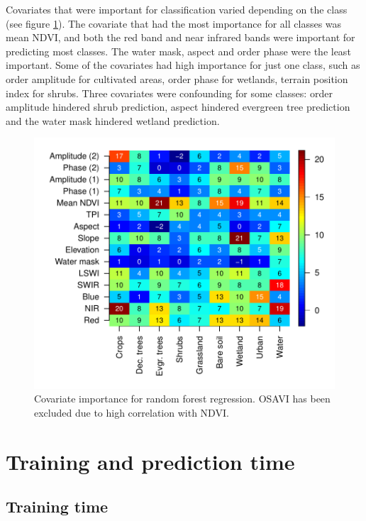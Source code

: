 \documentclass[a4paper,10pt]{book}
\begin{document}
Covariates that were important for classification varied depending on the class (see figure \ref{fig-variable-importance}). The covariate that had the most importance for all classes was mean NDVI, and both the red band and near infrared bands were important for predicting most classes. The water mask, aspect and  order phase were the least important. Some of the covariates had high importance for just one class, such as  order amplitude for cultivated areas,  order phase for wetlands, terrain position index for shrubs. Three covariates were confounding for some classes:  order amplitude hindered shrub prediction, aspect hindered evergreen tree prediction and the water mask hindered wetland prediction.

\begin{figure}
  \centering
  \includegraphics[width=\textwidth]{../plot/variable-importance}
  \caption{Covariate importance for random forest regression. OSAVI has been excluded due to high correlation with NDVI.}
  \label{fig-variable-importance}
\end{figure}

\section{Training and prediction time}

\subsection{Training time}
\end{document}
